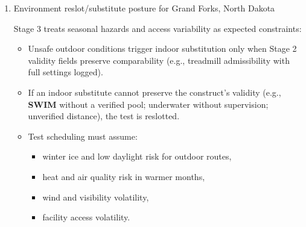 \documentclass[10pt]{article}
\begin{document}
\begin{enumerate}
\begin{itemize}
\item No more than one high-cost locomotion test event per 48 hours inside a protected window.
\item No more than one high-cost “total-system” day (locomotion test day plus additional major test) inside a protected window.
\item \textbf{CAL} events may be grouped only when:
  \begin{itemize}
  \item artifact requirements can be satisfied without compromising auditability,
  \item the grouping does not create a “fatigue cascade” into locomotion tests within the same window.
  \end{itemize}
\item Underwater (\textbf{C14}) is scheduled only if governance prerequisites are already satisfied; underwater is never used to “fill a slot” in a test week.
\item If spacing cannot be satisfied within the protected window, the correct posture is partial completion and reslotting remaining tests to the next protected window; stacking is prohibited.
\end{itemize}

\item Environment reslot/substitute posture for Grand Forks, North Dakota

Stage 3 treats seasonal hazards and access variability as expected constraints:

\begin{itemize}
\item Unsafe outdoor conditions trigger indoor substitution only when Stage 2 validity fields preserve comparability (e.g., treadmill admissibility with full settings logged).
\item If an indoor substitute cannot preserve the construct’s validity (e.g., \textbf{SWIM} without a verified pool; underwater without supervision; unverified distance), the test is reslotted.
\item Test scheduling must assume:
  \begin{itemize}
  \item winter ice and low daylight risk for outdoor routes,
  \item heat and air quality risk in warmer months,
  \item wind and visibility volatility,
  \item facility access volatility.
  \end{itemize}
\end{itemize}


\end{enumerate}
\end{document}
